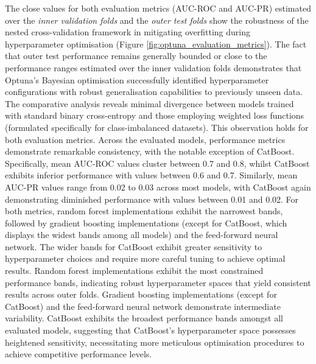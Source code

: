 \documentclass[nhess, manuscript]{copernicus}
\begin{document}
The close values for both evaluation metrics (AUC-ROC and AUC-PR) estimated over the \textit{inner validation folds} and the \textit{outer test folds} show the robustness of the nested cross-validation framework in mitigating overfitting during hyperparameter optimisation  (Figure \ref{fig:optuna_evaluation_metrics}). The fact that outer test performance remains generally bounded or close to the performance ranges estimated over the inner validation folds demonstrates that Optuna's Bayesian optimisation successfully identified hyperparameter configurations with robust generalisation capabilities to previously unseen data. The comparative analysis reveals minimal divergence between models trained with standard binary cross-entropy and those employing weighted loss functions (formulated specifically for class-imbalanced datasets). This observation holds for both evaluation metrics. Across the evaluated models, performance metrics demonstrate remarkable consistency, with the notable exception of CatBoost. Specifically, mean AUC-ROC values cluster between 0.7 and 0.8, whilst CatBoost exhibits inferior performance with values between 0.6 and 0.7. Similarly, mean AUC-PR values range from 0.02 to 0.03 across most models, with CatBoost again demonstrating diminished performance with values between 0.01 and 0.02. For both metrics, random forest implementations exhibit the narrowest bands, followed by gradient boosting implementations (except for CatBoost, which displays the widest bands among all models) and the feed-forward neural network. The wider bands for CatBoost exhibit greater sensitivity to hyperparameter choices and require more careful tuning to achieve optimal results. Random forest implementations exhibit the most constrained performance bands, indicating robust hyperparameter spaces that yield consistent results across outer folds. Gradient boosting implementations (except for CatBoost) and the feed-forward neural network demonstrate intermediate variability. CatBoost exhibits the broadest performance bands amongst all evaluated models, suggesting that CatBoost's hyperparameter space possesses heightened sensitivity, necessitating more meticulous optimisation procedures to achieve competitive performance levels.
\end{document}
